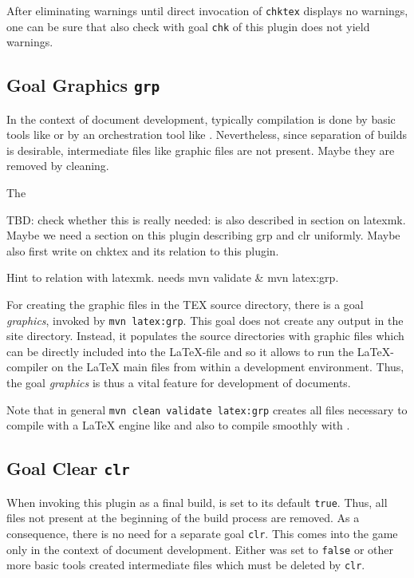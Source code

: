 After eliminating warnings until direct invocation of \texttt{chktex} displays no warnings, 
one can be sure that also check with goal \texttt{chk} of this plugin does not yield warnings. 


\subsection{Goal Graphics \texttt{grp}}\label{subsec:develGraph}

In the context of document development, 
typically compilation is done by basic tools like \lualatex{} 
or by an orchestration tool like . 
Nevertheless, since separation of builds is desirable, 
intermediate files like graphic files are not present. 
Maybe they are removed by cleaning. 

The 

TBD\@: check whether this is really needed: is also described in section on latexmk. 
Maybe we need a section on this plugin describing grp and clr uniformly. 
Maybe also first write on chktex and its relation to this plugin. 

Hint to relation with latexmk. 
needs mvn validate \& mvn latex:grp. 

For creating the graphic files in the TEX source directory, 
there is a goal \emph{graphics}, invoked by \texttt{mvn latex:grp}. 
This goal does not create any output in the site directory. 
Instead, it populates the source directories 
with graphic files which can be directly included into the \LaTeX-file 
and so it allows to run the \LaTeX-compiler on the \LaTeX{} main files 
from within a development environment. 
Thus, the goal \emph{graphics} is thus a vital feature 
for development of documents. 


Note that in general \texttt{mvn clean validate latex:grp} 
creates all files necessary to compile with a \LaTeX{} engine like \lualatex{} 
and also to compile smoothly with . 



\subsection{Goal Clear \texttt{clr}}\label{subsec:develClear}

When invoking this plugin as a final build, 
 is set to its default \texttt{true}. 
Thus, all files not present at the beginning of the build process are removed. 
As a consequence, there is no need for a separate goal \texttt{clr}. 
This comes into the game only in the context of document development. 
Either  was set to \texttt{false} 
or other more basic tools created intermediate files which must be deleted by \texttt{clr}. 

